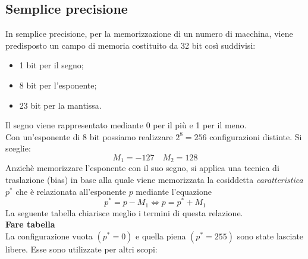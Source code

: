 \documentclass[12pt]{report}
\begin{document}
\subsection{Semplice precisione}
In semplice precisione, per la memorizzazione di un numero di macchina, viene predisposto un campo di memoria costituito da 32 bit così suddivisi:
\begin{itemize}
	\item 1 bit per il segno;
	\item 8 bit per l'esponente;
	\item 23 bit per la mantissa.
\end{itemize}
Il segno viene rappresentato mediante 0 per il più e 1 per il meno. \\
Con un'esponente di 8 bit possiamo realizzare $2^8 = 256$ configurazioni distinte. Si sceglie:
\[
M_1 = -127 \quad M_2 = 128
\]
Anzichè memorizzare l'esponente con il suo segno, si applica una tecnica di traslazione (bias) in base alla quale viene memorizzata la cosiddetta \textit{caratteristica} $p^*$ che è relazionata all'esponente $p$ mediante l'equazione
\[
p^* = p - M_1 \iff p = p^* + M_1
\]
La seguente tabella chiarisce meglio i termini di questa relazione. \\
\textbf{Fare tabella} \\
La configurazione vuota $(p^* = 0)$ e quella piena $(p^* = 255)$ sono state lasciate libere. Esse sono utilizzate per altri scopi:
\end{document}
